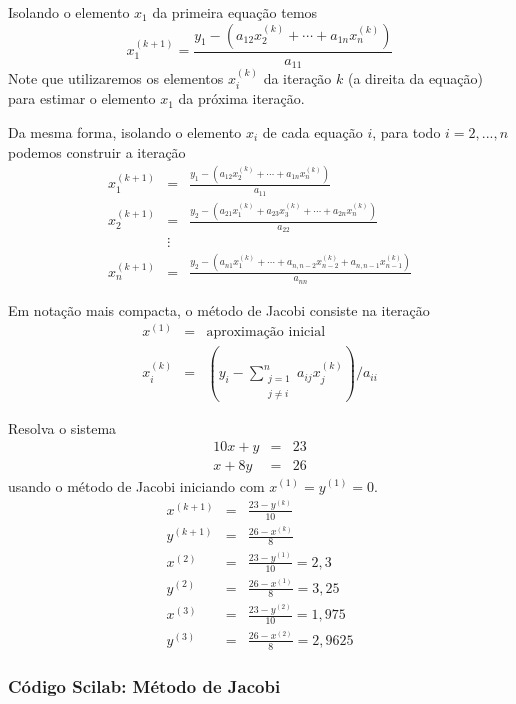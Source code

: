 Isolando o elemento $x_1$ da primeira equação temos
\begin{equation}
x_1^{(k+1)}= \frac{y_1 - \left(a_{12}x_2^{(k)}+\cdots+a_{1n}x_n^{(k)}\right)}{a_{11}} 
\end{equation}
Note que utilizaremos os elementos $x_i^{(k)}$ da iteração $k$ (a direita da equação) para estimar o elemento $x_1$ da próxima iteração. 

Da mesma forma, isolando o elemento $x_i$ de cada equação $i$, para todo $i=2,...,n$ podemos construir a iteração
\begin{eqnarray*}
x_1^{(k+1)}&=&\frac{y_1 - \left(a_{12}x_2^{(k)}+\cdots+a_{1n}x_n^{(k)}\right)}{a_{11}}\\
x_2^{(k+1)}&=&\frac{y_2 - \left(a_{21}x_1^{(k)}+a_{23}x_3^{(k)}+\cdots+a_{2n}x_n^{(k)}\right)}{a_{22}}\\
&\vdots&\\
x_n^{(k+1)}&=&\frac{y_2 - \left(a_{n1}x_1^{(k)}+\cdots+a_{n,n-2}x_{n-2}^{(k)}+a_{n,n-1}x_{n-1}^{(k)}\right)}{a_{nn}}
\end{eqnarray*}

Em notação mais compacta, o método de Jacobi consiste na iteração
\begin{eqnarray*}
  x^{(1)}   &=& \text{aproximação inicial}\\
  x_i^{(k)} &=& \left(y_i - \sum_{\substack{j=1\\j\ne i}}^{n} a_{ij}x_j^{(k)} \right)/{a_{ii}}
\end{eqnarray*}

\begin{ex}
Resolva o sistema
\begin{eqnarray*}
 10x+y&=&23\\
 x+8y &=&26
\end{eqnarray*}
usando o método de Jacobi iniciando com $x^{(1)}=y^{(1)}=0$.
\begin{eqnarray*}
x^{(k+1)}&=&\frac{23-y^{(k)}}{10}\\
y^{(k+1)}&=&\frac{26-x^{(k)}}{8}\\
x^{(2)}&=&\frac{23-y^{(1)}}{10}=2,3\\
y^{(2)}&=&\frac{26-x^{(1)}}{8}=3,25\\
x^{(3)}&=&\frac{23-y^{(2)}}{10}=1,975 \\
y^{(3)}&=&\frac{26-x^{(2)}}{8}=2,9625
\end{eqnarray*}
\end{ex}

\ifisscilab
\subsubsection{Código Scilab: Método de Jacobi}

